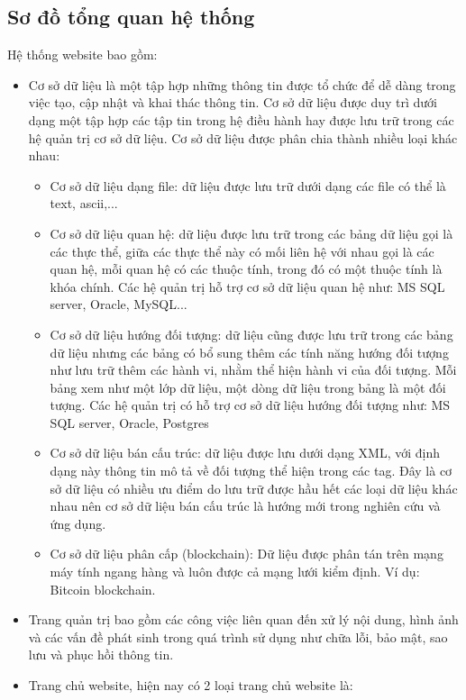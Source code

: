 \subsection{Sơ đồ tổng quan hệ thống}
Hệ thống website bao gồm:
\begin{itemize}
    \item Cơ sở dữ liệu là một tập hợp những thông tin được tổ chức để dễ dàng trong việc tạo, cập nhật và khai thác thông tin. Cơ sở dữ liệu được duy trì dưới dạng một tập hợp các tập tin trong hệ điều hành hay được lưu trữ trong các hệ quản trị cơ sở dữ liệu. Cơ sở dữ liệu được phân chia thành nhiều loại khác nhau:
   \begin{itemize}
   \item Cơ sở dữ liệu dạng file: dữ liệu được lưu trữ dưới dạng các file có thể là text, ascii,...
   \item Cơ sở dữ liệu quan hệ: dữ liệu được lưu trữ trong các bảng dữ liệu gọi là các thực thể, giữa các thực thể này có mối liên hệ với nhau gọi là các quan hệ, mỗi quan hệ có các thuộc tính, trong đó có một thuộc tính là khóa chính. Các hệ quản trị hỗ trợ cơ sở dữ liệu quan hệ như: MS SQL server, Oracle, MySQL...
   \item Cơ sở dữ liệu hướng đối tượng: dữ liệu cũng được lưu trữ trong các bảng dữ liệu nhưng các bảng có bổ sung thêm các tính năng hướng đối tượng như lưu trữ thêm các hành vi, nhằm thể hiện hành vi của đối tượng. Mỗi bảng xem như một lớp dữ liệu, một dòng dữ liệu trong bảng là một đối tượng. Các hệ quản trị có hỗ trợ cơ sở dữ liệu hướng đối tượng như: MS SQL server, Oracle, Postgres
   \item Cơ sở dữ liệu bán cấu trúc: dữ liệu được lưu dưới dạng XML, với định dạng này thông tin mô tả về đối tượng thể hiện trong các tag. Đây là cơ sở dữ liệu có nhiều ưu điểm do lưu trữ được hầu hết các loại dữ liệu khác nhau nên cơ sở dữ liệu bán cấu trúc là hướng mới trong nghiên cứu và ứng dụng.
   \item Cơ sở dữ liệu phân cấp (blockchain): Dữ liệu được phân tán trên mạng máy tính ngang hàng và luôn được cả mạng lưới kiểm định. Ví dụ: Bitcoin blockchain.
   \end{itemize}
    \item Trang quản trị bao gồm các công việc liên quan đến xử lý nội dung, hình ảnh và các vấn đề phát sinh trong quá trình sử dụng như chữa lỗi, bảo mật, sao lưu và phục hồi thông tin.
    \item Trang chủ website, hiện nay có 2 loại trang chủ website là: 
    \begin{itemize}

\end{itemize}
\end{itemize}
